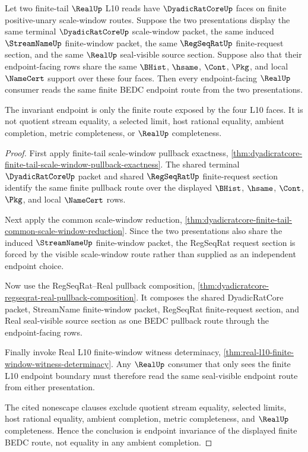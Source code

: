 \begin{theorem}
\label{thm:dyadicratcore-finite-tail-endpoint-invariance}
Let two finite-tail $\RealUp$ L10 reads have $\DyadicRatCoreUp$ faces on finite positive-unary scale-window routes. Suppose the two presentations display the same terminal $\DyadicRatCoreUp$ scale-window packet, the same induced $\StreamNameUp$ finite-window packet, the same $\RegSeqRatUp$ finite-request section, and the same $\RealUp$ seal-visible source section. Suppose also that their endpoint-facing rows share the same $\BHist$, $\hsame$, $\Cont$, $\Pkg$, and local $\NameCert$ support over these four faces. Then every endpoint-facing $\RealUp$ consumer reads the same finite BEDC endpoint route from the two presentations.

The invariant endpoint is only the finite route exposed by the four L10 faces. It is not quotient stream equality, a selected limit, host rational equality, ambient completion, metric completeness, or $\RealUp$ completeness.
\end{theorem}
\begin{proof}
First apply finite-tail scale-window pullback exactness, \autoref{thm:dyadicratcore-finite-tail-scale-window-pullback-exactness}. The shared terminal $\DyadicRatCoreUp$ packet and shared $\RegSeqRatUp$ finite-request section identify the same finite pullback route over the displayed $\BHist$, $\hsame$, $\Cont$, $\Pkg$, and local $\NameCert$ rows.

Next apply the common scale-window reduction, \autoref{thm:dyadicratcore-finite-tail-common-scale-window-reduction}. Since the two presentations also share the induced $\StreamNameUp$ finite-window packet, the RegSeqRat request section is forced by the visible scale-window route rather than supplied as an independent endpoint choice.

Now use the RegSeqRat--Real pullback composition, \autoref{thm:dyadicratcore-regseqrat-real-pullback-composition}. It composes the shared DyadicRatCore packet, StreamName finite-window packet, RegSeqRat finite-request section, and Real seal-visible source section as one BEDC pullback route through the endpoint-facing rows.

Finally invoke Real L10 finite-window witness determinacy, \autoref{thm:real-l10-finite-window-witness-determinacy}. Any $\RealUp$ consumer that only sees the finite L10 endpoint boundary must therefore read the same seal-visible endpoint route from either presentation.

The cited nonescape clauses exclude quotient stream equality, selected limits, host rational equality, ambient completion, metric completeness, and $\RealUp$ completeness. Hence the conclusion is endpoint invariance of the displayed finite BEDC route, not equality in any ambient completion.
\end{proof}

